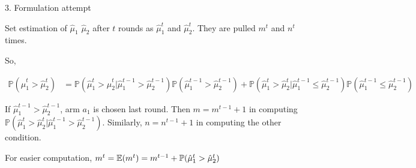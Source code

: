 \documentclass[fleqn]{article}
\def\PP{{\mathbb P}}\def\QQ{{\mathbb Q}}\def\RR{{\mathbb R}}
\begin{document}
\bigskip

3. Formulation attempt
\medskip

Set estimation of $\hat{\mu}_1$ $\hat{\mu}_2$ after $t$ rounds as $\hat{\mu}_1^t$ and $\hat{\mu}_2^t$. They are pulled $m^t$ and $n^t$ times.

So, 

\begin{align*}
\PP(\hat{\mu}_1^t>\hat{\mu}_2^t) &= \PP(\hat{\mu}_1^t>\hat{\mu}_2^t|\hat{\mu}_1^{t-1}>\hat{\mu}_2^{t-1})\PP(\hat{\mu}_1^{t-1}>\hat{\mu}_2^{t-1})+\PP(\hat{\mu}_1^t>\hat{\mu}_2^t|\hat{\mu}_1^{t-1}\leq\hat{\mu}_2^{t-1})\PP(\hat{\mu}_1^{t-1}\leq\hat{\mu}_2^{t-1})
\end{align*}

If $\hat{\mu}_1^{t-1}>\hat{\mu}_2^{t-1}$, arm $a_1$ is chosen last round. Then $m=m^{t-1}+1$ in computing $\PP(\hat{\mu}_1^t>\hat{\mu}_2^t|\hat{\mu}_1^{t-1}>\hat{\mu}_2^{t-1})$. Similarly, $n=n^{t-1}+1$ in computing the other condition.

For easier computation, $m^{t}=\EE(m^{t})=m^{t-1}+\PP(\hat{\mu}_1^{t}>\hat{\mu}_2^{t})$
\end{document}
